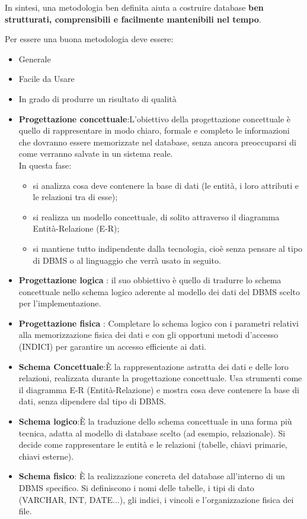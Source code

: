 In sintesi, una metodologia ben definita aiuta a costruire database \textbf{ben strutturati, comprensibili e facilmente mantenibili nel tempo}.

Per essere una buona metodologia deve essere:
\begin{itemize}
    \item Generale
    \item Facile da Usare
    \item In grado di produrre un risultato di qualità
\end{itemize}

\begin{itemize}
    \item \textbf{Progettazione concettuale}:L’obiettivo della progettazione concettuale è quello di rappresentare in modo chiaro, formale e completo le informazioni che dovranno essere memorizzate nel database, senza ancora preoccuparsi di come verranno salvate in un sistema reale.\\
    In questa fase:\\
    \begin{itemize}
        \item si analizza cosa deve contenere la base di dati (le entità, i loro attributi e le relazioni tra di esse);
        \item si realizza un modello concettuale, di solito attraverso il diagramma Entità-Relazione (E-R);
        \item si mantiene tutto indipendente dalla tecnologia, cioè senza pensare al tipo di DBMS o al linguaggio che verrà usato in seguito.
    \end{itemize}
    \item \textbf{Progettazione logica }: il suo obbiettivo è quello di tradurre lo schema concettuale nello schema logico aderente al modello dei dati del DBMS scelto per l'implementazione.
    \item \textbf{Progettazione fisica} : Completare lo schema logico con i parametri relativi alla memorizzazione fisica dei dati e con gli opportuni metodi d’accesso (INDICI) per garantire un accesso efficiente ai dati.
    \item \textbf{Schema Concettuale}:È la rappresentazione astratta dei dati e delle loro relazioni, realizzata durante la progettazione concettuale.
Usa strumenti come il diagramma E-R (Entità-Relazione) e mostra cosa deve contenere la base di dati, senza dipendere dal tipo di DBMS.
    \item \textbf{Schema logico}:È la traduzione dello schema concettuale in una forma più tecnica, adatta al modello di database scelto (ad esempio, relazionale).
Si decide come rappresentare le entità e le relazioni (tabelle, chiavi primarie, chiavi esterne).
    \item \textbf{Schema fisico}: È la realizzazione concreta del database all’interno di un DBMS specifico.
Si definiscono i nomi delle tabelle, i tipi di dato (VARCHAR, INT, DATE...), gli indici, i vincoli e l’organizzazione fisica dei file.
\end{itemize}
